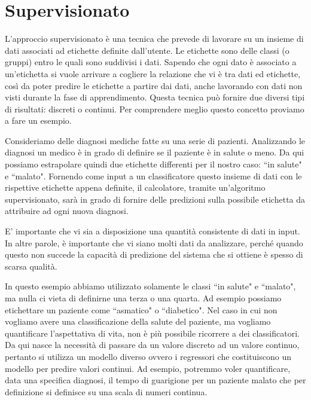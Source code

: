 \documentclass[12pt,italian]{report}
\begin{document}
\section{Supervisionato}

L'approccio supervisionato è una tecnica che prevede di lavorare su un insieme di dati associati ad etichette definite dall'utente. Le etichette sono delle classi (o gruppi) entro le quali sono suddivisi i dati. Sapendo che ogni dato è associato a un'etichetta si vuole arrivare a cogliere la relazione che vi è tra dati ed etichette, così da poter predire le etichette a partire dai dati, anche lavorando con dati non visti durante la fase di apprendimento.
Questa tecnica può fornire due diversi tipi di risultati: discreti o continui. Per comprendere meglio questo concetto proviamo a fare un esempio.

Consideriamo delle diagnosi mediche fatte su una serie di pazienti. Analizzando le diagnosi un medico è in grado di definire se il paziente è in salute o meno. Da qui possiamo estrapolare quindi due etichette differenti per il nostro caso: ``in salute" e ``malato". Fornendo come input a un classificatore questo insieme di dati con le rispettive etichette appena definite, il calcolatore, tramite un'algoritmo supervisionato, sarà in grado di fornire delle predizioni sulla possibile etichetta da attribuire ad ogni nuova diagnosi.

E' importante che vi sia a disposizione una quantità consistente di dati in input. In altre parole, è importante che vi siano molti dati da analizzare, perché quando questo non succede la capacità di predizione del sistema che si ottiene è spesso di scarsa qualità.

In questo esempio abbiamo utilizzato solamente le classi ``in salute" e ``malato", ma nulla ci vieta di definirne una terza o una quarta. Ad esempio possiamo etichettare un paziente come ``asmatico" o ``diabetico".
Nel caso in cui non vogliamo avere una classificazione della salute del paziente, ma vogliamo quantificare l'aspettativa di vita, non è più possibile ricorrere a dei classificatori. Da qui nasce la necessità di passare da un valore discreto ad un valore continuo, pertanto si utilizza un modello diverso ovvero i regressori che costituiscono un modello per predire valori continui. Ad esempio, potremmo voler quantificare, data una specifica diagnosi, il tempo di guarigione per un paziente malato che per definizione si definisce su una scala di numeri continua.
\end{document}
